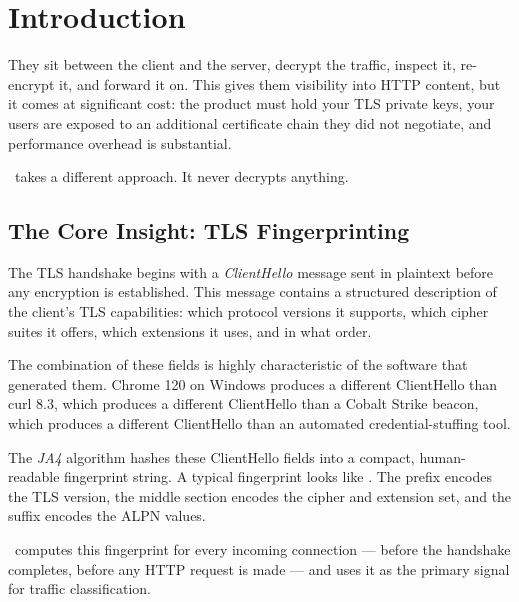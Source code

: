 
\chapter{Introduction}

They sit between the client and the server, decrypt the traffic, inspect it,
re-encrypt it, and forward it on. This gives them visibility into HTTP content,
but it comes at significant cost: the product must hold your TLS private keys,
your users are exposed to an additional certificate chain they did not negotiate,
and performance overhead is substantial.

\ja\ takes a different approach. It never decrypts anything.

\section{The Core Insight: TLS Fingerprinting}

The TLS handshake begins with a \emph{ClientHello} message sent in plaintext before
any encryption is established. This message contains a structured description of the
client's TLS capabilities: which protocol versions it supports, which cipher suites
it offers, which extensions it uses, and in what order.

The combination of these fields is highly characteristic of the software that generated
them. Chrome 120 on Windows produces a different ClientHello than curl 8.3, which
produces a different ClientHello than a Cobalt Strike beacon, which produces a different
ClientHello than an automated credential-stuffing tool.

The \emph{JA4} algorithm hashes these ClientHello fields into a compact,
human-readable fingerprint string. A typical fingerprint looks like
. The prefix encodes the
TLS version, the middle section encodes the cipher and extension set, and the suffix
encodes the ALPN values.

\ja\ computes this fingerprint for every incoming connection — before the handshake
completes, before any HTTP request is made — and uses it as the primary signal for
traffic classification.

